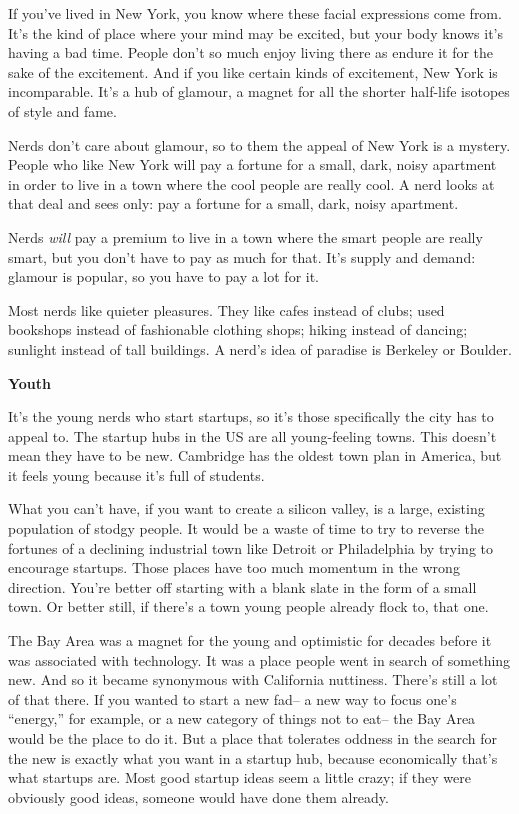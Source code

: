 If you've lived in New York, you know where these facial expressions
come from. It's the kind of place where your mind may be excited, but
your body knows it's having a bad time. People don't so much enjoy
living there as endure it for the sake of the excitement. And if you
like certain kinds of excitement, New York is incomparable. It's a hub
of glamour, a magnet for all the shorter half-life isotopes of style and
fame.

Nerds don't care about glamour, so to them the appeal of New York is a
mystery. People who like New York will pay a fortune for a small, dark,
noisy apartment in order to live in a town where the cool people are
really cool. A nerd looks at that deal and sees only: pay a fortune for
a small, dark, noisy apartment.

Nerds \emph{will} pay a premium to live in a town where the smart people
are really smart, but you don't have to pay as much for that. It's
supply and demand: glamour is popular, so you have to pay a lot for it.

Most nerds like quieter pleasures. They like cafes instead of clubs;
used bookshops instead of fashionable clothing shops; hiking instead of
dancing; sunlight instead of tall buildings. A nerd's idea of paradise
is Berkeley or Boulder.

\textbf{Youth}

It's the young nerds who start startups, so it's those specifically the
city has to appeal to. The startup hubs in the US are all young-feeling
towns. This doesn't mean they have to be new. Cambridge has the oldest
town plan in America, but it feels young because it's full of students.

What you can't have, if you want to create a silicon valley, is a large,
existing population of stodgy people. It would be a waste of time to try
to reverse the fortunes of a declining industrial town like Detroit or
Philadelphia by trying to encourage startups. Those places have too much
momentum in the wrong direction. You're better off starting with a blank
slate in the form of a small town. Or better still, if there's a town
young people already flock to, that one.

The Bay Area was a magnet for the young and optimistic for decades
before it was associated with technology. It was a place people went in
search of something new. And so it became synonymous with California
nuttiness. There's still a lot of that there. If you wanted to start a
new fad-- a new way to focus one's ``energy,'' for example, or a new
category of things not to eat-- the Bay Area would be the place to do
it. But a place that tolerates oddness in the search for the new is
exactly what you want in a startup hub, because economically that's what
startups are. Most good startup ideas seem a little crazy; if they were
obviously good ideas, someone would have done them already.

